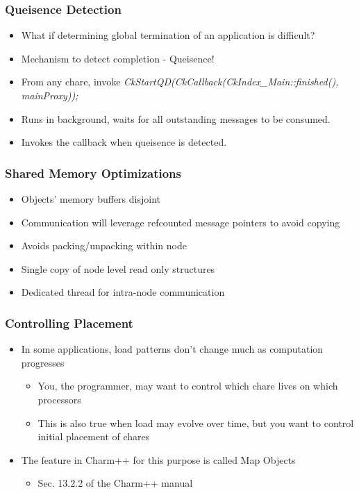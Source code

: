 \begin{frame}[fragile]
  \frametitle{Queisence Detection}
  \begin{itemize}
    \item What if determining global termination of an application is difficult?
    \item Mechanism to detect completion - Queisence!
    \item From any chare, invoke \emph{CkStartQD(CkCallback(CkIndex_Main::finished(), mainProxy));}
    \item Runs in background, waits for all outstanding messages to be consumed.
    \item Invokes the callback when queisence is detected.
  \end{itemize}
\end{frame}

\begin{frame}[fragile]
  \frametitle{Shared Memory Optimizations}
  \begin{itemize}
    \item Objects' memory buffers disjoint
    \item Communication will leverage refcounted message pointers to avoid copying
    \item Avoids packing/unpacking within node
    \item Single copy of node level read only structures
    \item Dedicated thread for intra-node communication
  \end{itemize}
\end{frame}

\begin{frame}[fragile]
  \frametitle{Controlling Placement}
  \begin{itemize}
    \item In some applications, load patterns don’t change much as computation progresses
    \begin{itemize}
      \item You, the programmer, may want to control which chare lives on which processors
      \item This is also true when  load may evolve over time, but you want to control initial placement of chares
    \end{itemize}
    \item The feature in Charm++ for this purpose is called Map Objects
    \begin{itemize}
      \item Sec. 13.2.2 of the Charm++ manual
    \end{itemize}
  \end{itemize}
\end{frame}

